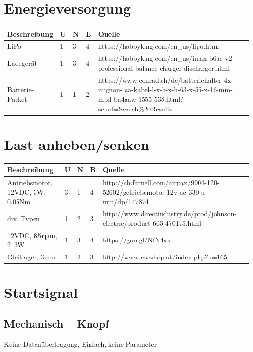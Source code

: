 \documentclass[a4paper]{report}
\begin{document}
\section{Energieversorgung}
\label{app:sec:EngVers}
\vspace{1em}
\noindent
\begin{tabular}{|p{}|p{}|p{}|p{}|p{}|}
	\hline
	\textbf{Beschreibung} & \textbf{U} & \textbf{N} & \textbf{B} & \textbf{Quelle} \\
	\hline
	LiPo & 1 & 3 & 4 & https://hobbyking.com/en\_us/lipo.html \\
	\hline
	Ladegerät & 1 & 3 & 4 & https://hobbyking.com/en\_us/imax-b6ac-v2-professional-balance-charger-discharger.html \\
	\hline
	Batterie-Packet & 1 & 1 & 2 & https://www.conrad.ch/de/batteriehalter-4x-mignon-
	aa-kabel-l-x-b-x-h-63-x-55-x-16-mm-mpd-ba4aaw-1555
	538.html?sc.ref=Search\%20Results
	\\
	\hline
\end{tabular}

\section{Last anheben/senken}
\label{app:sec:LastAnhub}
\begin{tabular}{|p{}|p{}|p{}|p{}|p{}|}
	\hline
	\textbf{Beschreibung} & \textbf{U} & \textbf{N} & \textbf{B} & \textbf{Quelle} \\
	\hline
	Antriebsmotor, 12VDC, 3W, 0.05Nm & 3 & 1 & 4 &
	http://ch.farnell.com/airpax/9904-120-52602/getriebemotor-12v-dc-330-u-min/dp/147874  \\
	\hline
	div. Typen & 1 & 2 & 3 & http://www.directindustry.de/prod/johnson-electric/product-665-470175.html\\
	\hline
	12VDC, \textbf{85rpm}, 2~3W & 1 & 3 & 4 & https://goo.gl/NfN4xx\\
	\hline
	Gleitlager, 3mm & 1 & 2 & 3 & http://www.cncshop.at/index.php?k=165\\
	\hline
\end{tabular}

\section{Startsignal}
\label{app:sec:Startsignal}
\subsection{Mechanisch – Knopf}
\label{app:ssec:StartKnopf}
Keine Datenübertragung, Einfach, keine Parameter
\end{document}
